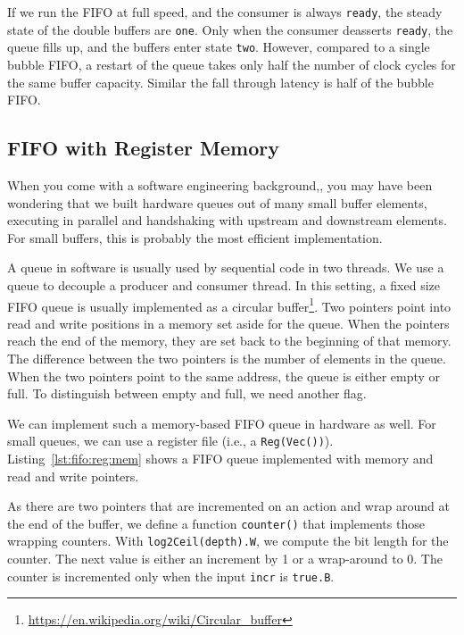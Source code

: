 \documentclass[%
    10pt,
    headinclude, footexclude,
    openright, %
    notitlepage,
    cleardoubleempty,
    headsepline,
    pointlessnumbers,
    bibtotoc, idxtotoc,
    ]{scrbook}
\newcommand{\code}[1]{{\lstinline[basicstyle=\small\ttfamily]{#1}}}
\newcommand{\myref}[2]{\href{#1}{#2}}
\renewcommand{\myref}[2]{{#2}{\footnote{\url{#1}}}}
\begin{document}
If we run the FIFO at full speed, and the consumer is always \code{ready},
the steady state of the double buffers are \code{one}. Only when the consumer
deasserts \code{ready}, the queue fills up, and the buffers enter state \code{two}.
However, compared to a single bubble FIFO, a restart of the queue takes
only half the number of clock cycles for the same buffer capacity.
Similar the fall through latency is half of the bubble FIFO.

\subsection{FIFO with Register Memory}

When you come with a software engineering background,, you may have been
wondering that we built hardware queues out of many small buffer
elements, executing in parallel and handshaking with upstream and downstream
elements. For small buffers, this is probably the most efficient implementation.

A queue in software is usually used by sequential code in two threads.
We use a queue to decouple a producer and consumer thread.
In this setting, a fixed size FIFO queue is usually implemented as a
\myref{https://en.wikipedia.org/wiki/Circular_buffer}{circular buffer}.
Two pointers point into read and write positions in a memory set aside
for the queue. When the pointers reach the end of the memory, they
are set back to the beginning of that memory. The difference between the two
pointers is the number of elements in the queue. When the two pointers
point to the same address, the queue is either empty or full.
To distinguish between empty and full, we need another flag.

We can implement such a memory-based FIFO queue in hardware as
well. For small queues, we can use a register file (i.e., a \code{Reg(Vec())}).
Listing~\ref{lst:fifo:reg:mem} shows a FIFO queue implemented with memory
and read and write pointers.

\newpage
{}

As there are two pointers that are incremented on an
action and wrap around at the end of the buffer, we define a function \code{counter()}
that implements those wrapping counters. With \code{log2Ceil(depth).W}, we
compute the bit length for the counter. The next value is either an increment by
1 or a wrap-around to 0.
The counter is incremented only when the input \code{incr} is \code{true.B}.
\end{document}
